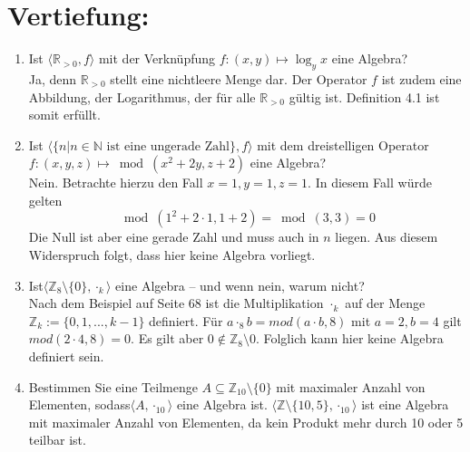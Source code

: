 

\DeclareMathOperator{\kgV}{kgV}
\usepackage{amsmath}
\usepackage{amssymb}


    \maketitle
    \section*{Vertiefung:}
    \begin{enumerate}[label=(\alph*)]
        \item Ist $\langle \mathbb{R}_{>0} , f \rangle$ mit der Verknüpfung $f : (x,y) \mapsto  \log_y x$ eine Algebra? \\
        Ja, denn $\mathbb{R}_{>0}$ stellt eine nichtleere Menge dar. Der Operator $f$ ist zudem eine Abbildung, 
        der Logarithmus, der für alle $\mathbb{R}_{>0}$ gültig ist. Definition 4.1 ist somit erfüllt.
        
        \item Ist $\langle \{n| n \in \mathbb{N} \textrm{ ist eine ungerade Zahl} \}, f \rangle$ mit dem dreistelligen 
        Operator $f : (x,y,z) \mapsto \bmod(x^2 + 2y, z + 2)$ eine Algebra? \\
        Nein. Betrachte hierzu den Fall $x = 1, y = 1, z = 1$. In diesem Fall würde gelten 
        $$\bmod(1^2 + 2 \cdot 1, 1 + 2 ) = \bmod(3,3) = 0$$ Die Null ist aber eine gerade Zahl und muss auch 
        in $n$ liegen. Aus diesem Widerspruch folgt, dass hier keine Algebra vorliegt.
        
        \item
         Ist$\langle \mathbb{Z}_8 \setminus \{0\}, \cdot_k \rangle $ eine Algebra – und wenn nein, warum nicht? \\
         Nach dem Beispiel auf Seite 68 ist die Multiplikation $\cdot_k$ auf der Menge $\mathbb{Z}_k := \{0, 1, ..., k-1\}$ definiert. Für $a \cdot_8 b = mod(a \cdot b ,8) $ mit $ a = 2, b = 4 $ gilt $mod(2\cdot 4, 8) = 0$. Es gilt aber $0 \not \in \mathbb{Z}_8 \setminus {0}.$ Folglich kann hier keine Algebra definiert sein.
        \item
        Bestimmen Sie eine Teilmenge $A \subseteq \mathbb{Z}_{10} \setminus \{0\} $ mit maximaler Anzahl von Elementen, sodass$\langle A, \cdot_{10} \rangle$ eine Algebra ist. 
        $\langle \mathbb{Z} \setminus \{10, 5\}, \cdot_{10} \rangle $ ist eine Algebra mit maximaler Anzahl von Elementen, da kein  Produkt mehr durch 10 oder 5 teilbar ist.
        

\end{enumerate}
